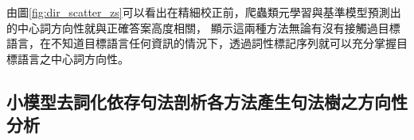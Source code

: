 由圖\ref{fig:dir_scatter_zs}可以看出在精細校正前，爬蟲類元學習與基準模型預測出的中心詞方向性就與正確答案高度相關，
顯示這兩種方法無論有沒有接觸過目標語言，在不知道目標語言任何資訊的情況下，透過詞性標記序列就可以充分掌握目標語言之中心詞方向性。

\subsection{小模型去詞化依存句法剖析各方法產生句法樹之方向性分析}



\iffalse




\fi
